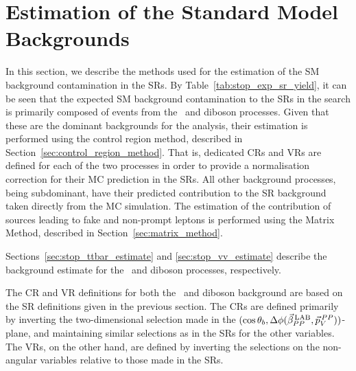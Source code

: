 \section{Estimation of the Standard Model Backgrounds}
\label{sec:stop_background_estimate}

In this section, we describe the methods used for the estimation of the SM background
contamination in the SRs.
By Table~\ref{tab:stop_exp_sr_yield}, it can be seen that the expected SM background
contamination to the SRs in the \bWN search is primarily composed of events
from the \ttbar~and diboson processes.
Given that these are the dominant backgrounds for the analysis, their estimation is performed
using the control region method, described in Section~\ref{sec:control_region_method}.
That is, dedicated CRs and VRs are defined for each of the two processes in order
to provide a normalisation correction for their MC prediction in the SRs.
All other background processes, being subdominant, have their predicted contribution
to the SR background taken directly from the MC simulation.
The estimation of the contribution of sources leading to fake and non-prompt leptons
is performed using the Matrix Method, described in Section~\ref{sec:matrix_method}.

Sections~\ref{sec:stop_ttbar_estimate} and \ref{sec:stop_vv_estimate} describe
the background estimate for the \ttbar~and diboson processes, respectively.


The CR and VR definitions for both the \ttbar~and diboson background are based on the
SR definitions given in the previous section.
The CRs are defined primarily by inverting the two-dimensional selection
made in the $(\cos\theta_b, \Delta \phi (\vec{\beta}_{PP}^{\,\text{LAB}}, \vec{p}_V^{\,PP}))$-plane, and maintaining similar selections as in the SRs for the other variables.
The VRs, on the other hand, are defined by inverting the selections on the non-angular variables relative to those
made in the SRs.

